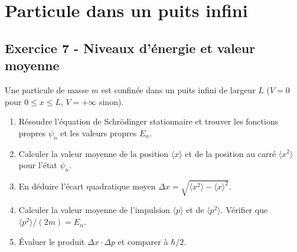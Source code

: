 \documentclass[12pt,a4paper]{article}
\begin{document}
\newpage
\section{Particule dans un puits infini}

\subsection*{Exercice 7 - Niveaux d'énergie et valeur moyenne \niveau{\moyen}}

\begin{boiteexercice}
Une particule de masse $m$ est confinée dans un puits infini de largeur $L$ ($V=0$ pour
$0\leq x\leq L$, $V=+\infty$ sinon).
\begin{enumerate}
  \item Résoudre l'équation de Schrödinger stationnaire et trouver les fonctions propres $\psi_n$
    et les valeurs propres $E_n$.
  \item Calculer la valeur moyenne de la position $\langle x\rangle$ et de la position au carré
    $\langle x^2\rangle$ pour l'état $\psi_n$.
  \item En déduire l'écart quadratique moyen $\Delta x = \sqrt{\langle x^2\rangle - \langle x\rangle^2}$.
  \item Calculer la valeur moyenne de l'impulsion $\langle p\rangle$ et de $\langle p^2\rangle$.
    Vérifier que $\langle p^2\rangle/(2m) = E_n$.
  \item Évaluer le produit $\Delta x \cdot \Delta p$ et comparer à $\hbar/2$.
\end{enumerate}
\end{boiteexercice}
\end{document}
